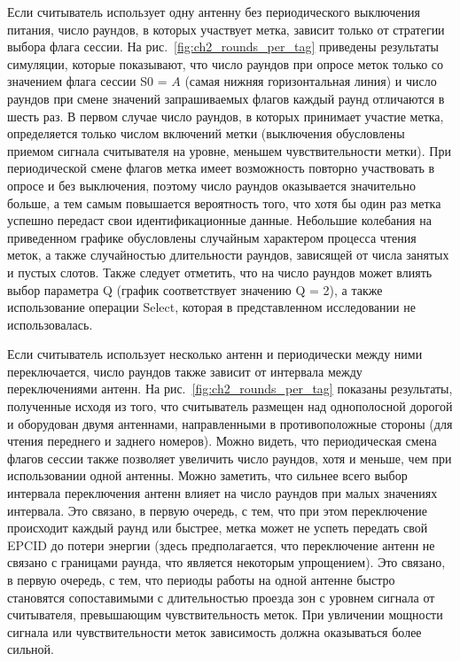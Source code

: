 Если считыватель использует одну антенну без периодического выключения питания, число раундов, в которых участвует метка, зависит только от стратегии выбора флага сессии. На рис.~\ref{fig:ch2_rounds_per_tag} приведены результаты симуляции, которые показывают, что число раундов при опросе меток только со значением флага сессии S0 = $A$ (самая нижняя горизонтальная линия) и число раундов при смене значений запрашиваемых флагов каждый раунд отличаются в шесть раз. В первом случае число раундов, в которых принимает участие метка, определяется только числом включений метки (выключения обусловлены приемом сигнала считывателя на уровне, меньшем чувствительности метки). При периодической смене флагов метка имеет возможность повторно участвовать в опросе и без выключения, поэтому число раундов оказывается значительно больше, а тем самым повышается вероятность того, что хотя бы один раз метка успешно передаст свои идентификационные данные. Небольшие колебания на приведенном графике обусловлены случайным характером процесса чтения меток, а также случайностью длительности раундов, зависящей от числа занятых и пустых слотов. Также следует отметить, что на число раундов может влиять выбор параметра Q (график соответствует значению Q = 2), а также использование операции Select, которая в представленном исследовании не использовалась.

Если считыватель использует несколько антенн и периодически между ними переключается, число раундов также зависит от интервала между переключениями антенн. На рис.~\ref{fig:ch2_rounds_per_tag} показаны результаты, полученные исходя из того, что считыватель размещен над однополосной дорогой и оборудован двумя антеннами, направленными в противоположные стороны (для чтения переднего и заднего номеров). Можно видеть, что периодическая смена флагов сессии также позволяет увеличить число раундов, хотя и меньше, чем при использовании одной антенны. Можно заметить, что сильнее всего выбор интервала переключения антенн влияет на число раундов при малых значениях интервала. Это связано, в первую очередь, с тем, что при этом переключение происходит каждый раунд или быстрее, метка может не успеть передать свой EPCID до потери энергии (здесь предполагается, что переключение антенн не связано с границами раунда, что является некоторым упрощением). Это связано, в первую очередь, с тем, что периоды работы на одной антенне быстро становятся сопоставимыми с длительностью проезда зон с уровнем сигнала от считывателя, превышающим чувствительность меток. При увличении мощности сигнала или чувствительности меток зависимость должна оказываться более сильной.

